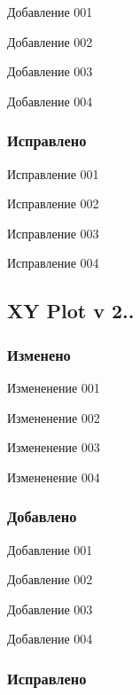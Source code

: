 \begin{DoxyItemize}
\item Добавление 001 \item Добавление 002 \item Добавление 003 \item Добавление 004 \end{DoxyItemize}
\hypertarget{page1_ssubV231Fixed}{}\subsubsection{Исправлено}\label{page1_ssubV231Fixed}
\begin{DoxyItemize}
\item Исправление 001 \item Исправление 002 \item Исправление 003 \item Исправление 004 \end{DoxyItemize}
\hypertarget{page1_subsecV221}{}\subsection{X\-Y Plot v 2..}\label{page1_subsecV221}
\hypertarget{page1_ssubV101Changes}{}\subsubsection{Изменено}\label{page1_ssubV101Changes}
\begin{DoxyItemize}
\item Измененение 001 \item Измененение 002 \item Измененение 003 \item Измененение 004 \end{DoxyItemize}
\hypertarget{page1_ssubV221Add}{}\subsubsection{Добавлено}\label{page1_ssubV221Add}
\begin{DoxyItemize}
\item Добавление 001 \item Добавление 002 \item Добавление 003 \item Добавление 004 \end{DoxyItemize}
\hypertarget{page1_ssubV221Fixed}{}\subsubsection{Исправлено}\label{page1_ssubV221Fixed}
